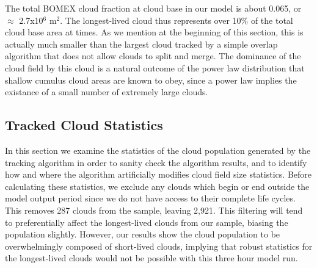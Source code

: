\documentclass[acp]{copernicus}
\begin{document}
The total BOMEX cloud fraction at cloud base in our model is about 0.065, or 
$\approx$ 2.7x10$^6$ m$^2$. The longest-lived cloud thus represents over 10\% 
of the total cloud base area at times.  As we mention at the beginning of this 
section, this is actually much smaller than the largest cloud tracked by a 
simple overlap algorithm that does not allow clouds to split and merge.  The 
dominance of the cloud field by this cloud is a natural outcome of the power
law distribution that shallow cumulus cloud areas are known to obey, since 
a power law implies the existance of a small number of extremely large clouds.

\subsection{Tracked Cloud Statistics}

In this section we examine the statistics of the cloud population generated by 
the tracking algorithm in order to sanity check the algorithm results, and to 
identify how and where the algorithm artificially modifies cloud field size
statistics.  Before calculating these statistics, we exclude any clouds which 
begin or end outside the model output period since we do not have access to 
their complete life cycles. This removes 287 clouds from the sample, leaving 
2,921.  This filtering will tend to preferentially affect the longest-lived 
clouds from our sample, biasing the population slightly.  However, our results 
show the cloud population to be overwhelmingly composed of short-lived clouds,
implying that robust statistics for the longest-lived clouds would not be 
possible with this three hour model run.
\end{document}
